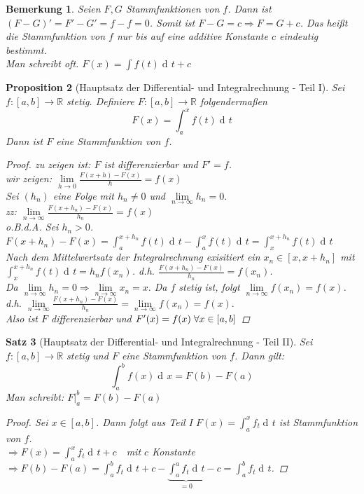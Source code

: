 \documentclass[a4paper,titlepage,oneside]{article}
\def\R{\ensuremath{\mathbb{R}} }
\newcommand{\der}{\operatorname{d\!}{}}
\def\sp{\hspace{0,1cm}}
\renewcommand{\liminf}[2][n]{\ensuremath{\lim\limits_{#1 \rightarrow \infty}{#2}}}
\newcommand{\limnull}[2][n]{\ensuremath{\lim\limits_{#1 \rightarrow 0}{#2}}}
\newcommand{\integral}[4][x]{\ensuremath{\int_{#2}^{#3}{#4\der #1}}}
\newcommand{\intAB}[2][x]{\integral[#1]{a}{b}{#2}}
\theoremstyle{thmstyle}
\newtheorem{satz}{Satz}[section]
\newtheorem{prop}[satz]{Proposition}
\newtheorem{bem}[satz]{Bemerkung}
\theoremstyle{subthmstyle}
\begin{document}
\begin{bem}
Seien $F,G$ Stammfunktionen von $f$. Dann ist $(F-G)' = F' - G' = f - f = 0$. Somit ist $F-G = c \Rightarrow F = G + c$. Das heißt die Stammfunktion von $f$ nur bis auf eine additive Konstante $c$ eindeutig bestimmt.\\
Man schreibt oft. $\displaystyle F(x) = \int{f(t)\der t} + c$
\end{bem}

\begin{prop}[Hauptsatz der Differential- und Integralrechnung - Teil I]
Sei $f: [a,b] \to \R$ stetig. Definiere $F: [a,b] \to \R$ folgendermaßen
\[F(x) = \int_{a}^{x}{f(t)\der t}\]
Dann ist $F$ eine Stammfunktion von $f$.
\begin{proof}
zu zeigen ist: $F$ ist differenzierbar und $F' = f$.\\
wir zeigen: $\displaystyle \limnull[h]{\frac{F(x+h) - F(x)}{h}} = f(x)$\\
Sei $(h_n)$ eine Folge mit $h_n \ne 0$ und $\liminf{h_n} = 0.$\\
zz: $\displaystyle \liminf{\frac{F(x+h_n) - F(x)}{h_n}} = f(x)$\\
o.B.d.A. Sei $h_n > 0$.\\
$\displaystyle F(x+h_n) - F(x) = \int_{a}^{x+h_n}{f(t)\der t} - \int_{a}^{x}{f(t)\der t} = \int_{x}^{x+h_n}{f(t)\der t}$\\
Nach dem Mittelwertsatz der Integralrechnung exisitiert ein $\displaystyle x_n \in [x, x+ h_n]$ mit $\int_{x}^{x+h_n}{f(t)\der t} = h_n f(x_n)$.
d.h. $\displaystyle \frac{F(x+h_n) - F(x)}{h_n} = f(x_n)$.\\
Da $ \liminf{h_n} = 0 \Rightarrow \liminf{x_n} = x.$ Da $f$ stetig ist, folgt $\liminf{f(x_n)} = f(x)$. d.h. $\displaystyle \liminf{\frac{F(x+h_n) - F(x)}{h_n}} = \liminf{f(x_n)} = f(x).$\\
Also ist $F$ differenzierbar und $F'(x) = f(x) \sp \forall x \in [a,b]$
\end{proof}
\end{prop}

\begin{satz}[Hauptsatz der Differential- und Integralrechnung - Teil II]
Sei $f: [a,b] \to \R$ stetig und $F$ eine Stammfunktion von $f$. Dann gilt: \[ \intAB{f(x)} = F(b) - F(a)\]
Man schreibt: $\displaystyle F|_a^b = F(b) - F(a)$
\begin{proof}
Sei $x \in [a,b]$. Dann folgt aus Teil I $\displaystyle F(x) = \int_{a}^{x}{f_t \der t}$ ist Stammfunktion von $f$.\\
$\displaystyle\Rightarrow F(x) = \int_{a}^{x}{f_t \der t} + c \quad $mit $c$ Konstante\\
$\displaystyle\Rightarrow F(b) - F(a) = \int_{a}^{b}{f_t \der t} + c - \underbrace{\int_{a}^{a}{f_t \der t}}_{= 0} - c = \int_{a}^{b}{f_t \der t}$.
\end{proof}
\end{satz}
\end{document}
